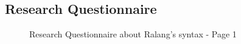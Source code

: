 \documentclass[a4paper]{article}
\begin{document}
\begin{appendices}
	\section{Research Questionnaire}
	\label{App:Questionnaire}
	\begin{figure}[h!]
		\caption{Research Questionnaire about Ralang's syntax - Page 1}
	\end{figure}
	\newpage
	\begin{figure}[h!]
		\centering{
}
\end{figure}
\end{appendices}
\end{document}
